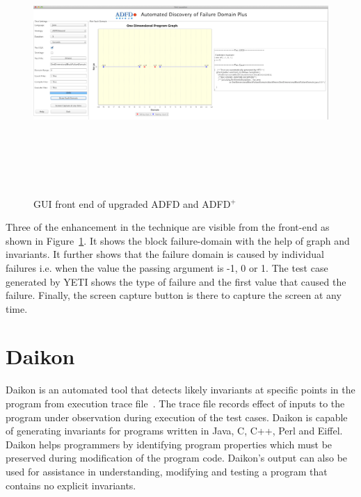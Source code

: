 \bigskip
\begin{figure}[ht]
\centering
\includegraphics[width= 15.5cm,height=10cm]{chapter7/adfdUpgraded.png}
\bigskip
\caption{GUI front end of upgraded ADFD and ADFD$^+$}
\label{fig:adfdUpgraded}
\end{figure}
\bigskip

Three of the enhancement in the technique are visible from the front-end as shown in Figure~\ref{fig:adfdUpgraded}. It shows the block failure-domain with the help of graph and invariants. It further shows that the failure domain is caused by individual failures i.e. when the value the passing argument is -1, 0 or 1. The test case generated by YETI shows the type of failure and the first value that caused the failure. Finally, the screen capture button is there to capture the screen at any time.


\section{Daikon}
Daikon is an automated tool that detects likely invariants at specific points in the program from execution trace file~\cite{ernst2007daikon}. The trace file records effect of inputs to the program under observation during execution of the test cases. Daikon is capable of generating invariants for programs written in Java, C, C++, Perl and Eiffel. Daikon helps programmers by identifying program properties which must be preserved during modification of the program code. Daikon's output can also be used for assistance in understanding, modifying and testing a program that contains no explicit invariants.

